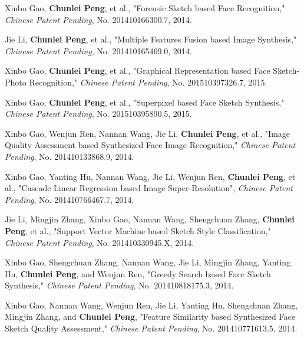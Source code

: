 \documentclass[11pt]{article}
\renewcommand{\section}[1]{\pagebreak[3]%
    \vspace{1.3\baselineskip}%
    \phantomsection\addcontentsline{toc}{section}{#1}%
    \noindent\llap{\scshape\smash{\parbox[t]{\marginparwidth}{\hyphenpenalty=10000\raggedright #1}}}%
    \vspace{-\baselineskip}\par}
\begin{document}

\section{Patents}

\begin{bibenum}

\item Xinbo Gao, \textbf{Chunlei Peng}, et al., "Forensic Sketch based Face Recognition," \emph{Chinese Patent Pending}, No. 201410166300.7, 2014.

\item Jie Li, \textbf{Chunlei Peng}, et al., "Multiple Features Fusion based Image Synthesis," \emph{Chinese Patent Pending}, No. 201410165469.0, 2014.

\item Xinbo Gao, \textbf{Chunlei Peng}, et al., "Graphical Representation based Face Sketch-Photo Recognition," \emph{Chinese Patent Pending}, No. 201510397326.7, 2015.

\item Xinbo Gao, \textbf{Chunlei Peng}, et al., "Superpixel based Face Sketch Synthesis," \emph{Chinese Patent Pending}, No. 201510395890.5, 2015.

\item Xinbo Gao, Wenjun Ren, Nannan Wang, Jie Li, \textbf{Chunlei Peng}, et al., "Image Quality Assessment based Synthesized Face Image Recognition," \emph{Chinese Patent Pending}, No. 201410133868.9, 2014.

\item Xinbo Gao, Yanting Hu, Nannan Wang, Jie Li, Wenjun Ren, \textbf{Chunlei Peng}, et al., "Cascade Linear Regression based Image Super-Resolution", \emph{Chinese Patent Pending}, No. 201410766467.7, 2014.

\item Jie Li, Mingjin Zhang, Xinbo Gao, Nannan Wang, Shengchuan Zhang, \textbf{Chunlei Peng}, et al., "Support Vector Machine based Sketch Style Classification," \emph{Chinese Patent Pending}, No. 201410330945.X, 2014.

\item Xinbo Gao, Shengchuan Zhang, Nannan Wang, Jie Li, Mingjin Zhang, Yanting Hu, \textbf{Chunlei Peng}, and Wenjun Ren, "Greedy Search based Face Sketch Synthesis," \emph{Chinese Patent Pending}, No. 201410818175.3, 2014.

\item Xinbo Gao, Nannan Wang, Wenjun Ren, Jie Li, Yanting Hu, Shengchuan Zhang, Mingjin Zhang, and \textbf{Chunlei Peng}, "Feature Similarity based Synthesized Face Sketch Quality Assessment," \emph{Chinese Patent Pending}, No. 201410771613.5, 2014.


\end{bibenum}
\end{document}
